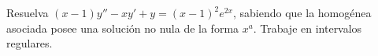 Resuelva $(x-1)y''-xy'+y=(x-1)^2e^{2x}$, sabiendo que la homogénea asociada posee una solución no nula de la forma $x^a$. Trabaje en intervalos regulares.
